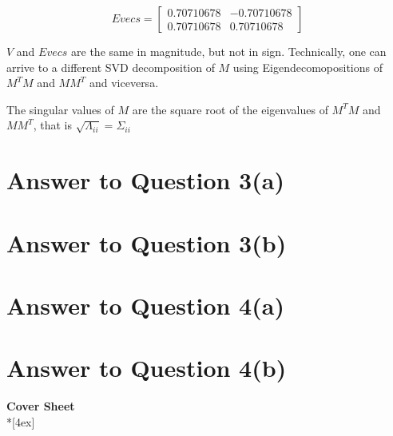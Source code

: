 \documentclass[11pt]{article}
\begin{document}
\begin{equation}
    Evecs =
  \begin{bmatrix}
    0.70710678 & -0.70710678 \\
    0.70710678 &  0.70710678 
  \end{bmatrix}
\end{equation}

$V$ and $Evecs$ are the same in magnitude, but not in sign. Technically, one can arrive to a different SVD decomposition of $M$ using Eigendecomopositions of $M^TM$ and $MM^T$ and viceversa.

The singular values of $M$ are the square root of the eigenvalues of $M^TM$ and $MM^T$, that is $\sqrt{\Lambda_{ii}} = \Sigma_{ii}$


\pagebreak[4]
\section*{Answer to Question 3(a)}

\pagebreak[4]
\section*{Answer to Question 3(b)}

\pagebreak[4]
\section*{Answer to Question 4(a)}

\pagebreak[4]
\section*{Answer to Question 4(b)}

\pagebreak[4]
\begin{center}
\LARGE{\bf \textsf{Cover Sheet}} \\*[4ex]
\end{center}
\end{document}
